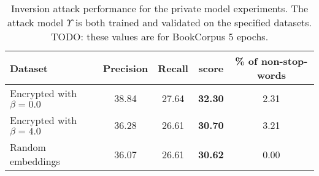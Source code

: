 \begin{table}[!ht]
	\begin{tabular*}{\linewidth}{ !{\extracolsep\fill} l c c >{\bfseries}c c } %
		\toprule
			Dataset							& Precision		& Recall	& \FOne{} score & \% of non-stop-words	\\
		\midrule
			Encrypted with $\beta = 0.0$	& 38.84			& 27.64		& 32.30			& 2.31					\\
			Encrypted with $\beta = 4.0$	& 36.28			& 26.61		& 30.70			& 3.21					\\
			Random embeddings				& 36.07			& 26.61		& 30.62			& 0.00					\\
		\bottomrule
	\end{tabular*}
	\caption[Inversion attack performance for the private model experiments]{
		Inversion attack performance for the private model experiments.
		The attack model $\Upsilon$ is both trained and validated on the specified datasets.
		{\color{red}TODO\@: these values are for BookCorpus 5 epochs.}
	}%
	\label{table:knn-private}
\end{table}
